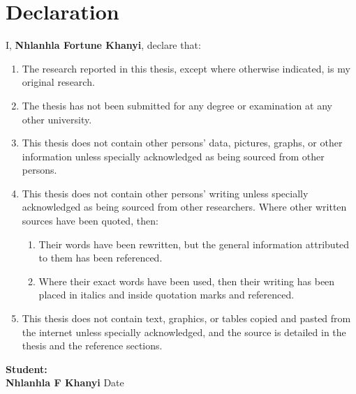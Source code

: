 \section*{Declaration}


I, \textbf{Nhlanhla Fortune Khanyi}, declare that:   

\begin{enumerate}
    \item The research reported in this thesis, except where otherwise indicated, is my original research. 
    \item The thesis has not been submitted for any degree or examination at any other university. 
    \item This thesis does not contain other persons' data, pictures, graphs, or other information unless specially acknowledged as being sourced from other persons.  
    \item This thesis does not contain other persons' writing unless specially acknowledged as being sourced from other researchers. Where other written sources have been quoted, then:  
    
    \begin{enumerate}
        \item Their words have been rewritten, but the general information attributed to them has been referenced.  
        \item Where their exact words have been used, then their writing has been placed in italics and inside quotation marks and referenced.  
    \end{enumerate} 
    
    \item This thesis does not contain text, graphics, or tables copied and pasted from the internet unless specially acknowledged, and the source is detailed in the thesis and the reference sections. 
\end{enumerate}

\vskip 5mm

{\bf Student:}  \makebox[44mm]{\hrulefill}\hfill \makebox[40mm]{\hrulefill}\\
{\bf Nhlanhla F Khanyi} \hfill Date


